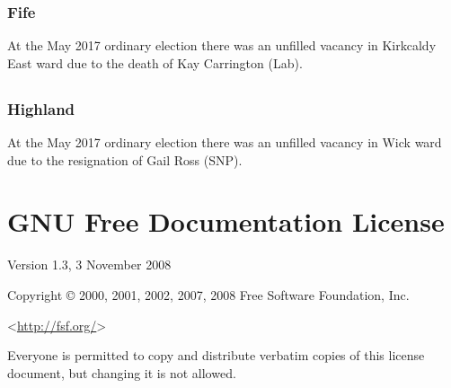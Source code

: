 \documentclass[a4paper,openany]{book}
\begin{document}
\begin{resultsiii}
\subsection*{Fife}

At the May 2017 ordinary election there was an unfilled vacancy in Kirkcaldy East ward due to the death of Kay Carrington (Lab).

\section[Highland Councils]{}

\subsection*{Highland}

At the May 2017 ordinary election there was an unfilled vacancy in Wick ward due to the resignation of Gail Ross (SNP).

\end{resultsiii}

\clearpage
{}
{\scriptsize%
\frenchspacing\printindex}
\thispagestyle{plain}

\chapter*{{GNU Free Documentation License}}
\pagestyle{plain}

 Version 1.3, 3 November 2008


 Copyright \copyright{} 2000, 2001, 2002, 2007, 2008 Free Software Foundation, Inc.
 
 \bigskip
 
 <\url{http://fsf.org/}>
 
 \bigskip
 
 Everyone is permitted to copy and distribute verbatim copies
 of this license document, but changing it is not allowed.
\end{document}
